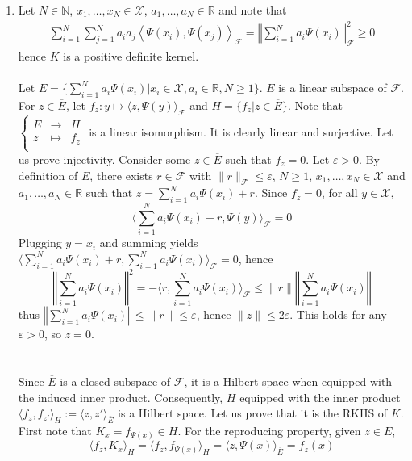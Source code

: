 \documentclass[a4paper,11pt, hidelinks]{article}
\begin{document}
\begin{enumerate}
  \item Let $N\in \mathbb N$, $x_1,\ldots, x_N \in \mathcal X$, $a_1,\ldots, a_N \in \mathbb R$ and note that $$\begin{aligned}
    \sum_{i=1}^N \sum_{j=1}^N a_i a_j \left\langle\Psi(x_i), \Psi(x_j)\right\rangle_{\mathcal{F}} = \left \Vert\sum_{i=1}^N a_i \Psi(x_i) \right \Vert^2_{\mathcal{F}} \geq 0
  \end{aligned}$$
  hence $K$ is a positive definite kernel.\\
  \\
  Let $E = \{\sum_{i=1}^N a_i \Psi(x_i)| x_i \in \mathcal X, a_i \in \mathbb R, N\geq 1\}$. $E$ is a linear subspace of $\mathcal F$.\newline
  For $z\in \overline E$, let $f_z:y\mapsto \langle z, \Psi(y)\rangle_{\mathcal F}$ and $H = \{f_z| z\in \overline E\}$. Note that $\left\{
  \begin{array}{rcl}
    \overline E & \longrightarrow & H \\
    z & \longmapsto & f_z \\
  \end{array}
  \right.$ is a linear isomorphism. It is clearly linear and surjective.\newline
  Let us prove injectivity. Consider some $z\in \overline E$ such that $f_z=0$. Let $\varepsilon >0$. By definition of $\overline E$, there exists $r\in \mathcal F$ with $\|r\|_{\mathcal F}\leq \varepsilon$, $N\geq 1$, $x_1,\ldots,x_N \in \mathcal X$ and $a_1,\ldots,a_N \in \mathbb R$ such that $z=\sum_{i=1}^N a_i \Psi(x_i) + r$. Since $f_z=0$, for all $y\in \mathcal X$, $$\langle \sum_{i=1}^N a_i \Psi(x_i) + r, \Psi(y)\rangle_{\mathcal F}=0$$
  Plugging $y=x_i$ and summing yields $\langle \sum_{i=1}^N a_i \Psi(x_i) + r, \sum_{i=1}^N a_i \Psi(x_i)\rangle_{\mathcal F}=0$, hence $$\left\Vert\sum_{i=1}^N a_i \Psi(x_i) \right\Vert^2 = -\langle r, \sum_{i=1}^N a_i \Psi(x_i) \rangle_{\mathcal F}\leq \|r\| \left\Vert\sum_{i=1}^N a_i \Psi(x_i) \right\Vert$$ thus $\displaystyle \left\Vert\sum_{i=1}^N a_i \Psi(x_i) \right\Vert \leq \|r\| \leq \varepsilon$, hence $\|z\|\leq 2 \varepsilon$. This holds for any $\varepsilon>0$, so $z=0$.\\
  \\ \\
  Since $\overline E$ is a closed subspace of $\mathcal F$, it is a Hilbert space when equipped with the induced inner product. Consequently, $H$ equipped with the inner product $\langle f_z, f_{z'} \rangle_H := \langle z, z' \rangle_{\overline E}$ is a Hilbert space. Let us prove that it is the RKHS of $K$. First note that $K_x = f_{\Psi(x)}\in H$. For the reproducing property, given $z\in \overline E$, $$\langle f_z, K_x \rangle_{H} = \langle f_z, f_{\Psi(x)} \rangle_{H} = \langle z, \Psi(x) \rangle_{\overline E} = f_z(x)$$
\end{enumerate}
\end{document}
